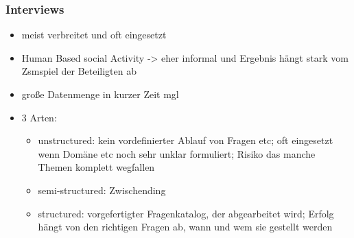\subsubsection{Interviews}
\begin{itemize}
	\item meist verbreitet und oft eingesetzt
	\item Human Based social Activity -> eher informal und Ergebnis hängt stark vom Zsmspiel der Beteiligten ab
	\item große Datenmenge in kurzer Zeit mgl
	\item 3 Arten:
	\begin{itemize}
		\item unstructured: kein vordefinierter Ablauf von Fragen etc; oft eingesetzt wenn Domäne etc noch sehr unklar formuliert; Risiko das manche Themen komplett wegfallen
		\item semi-structured: Zwischending
		\item structured: vorgefertigter Fragenkatalog, der abgearbeitet wird; Erfolg hängt von den richtigen Fragen ab, wann und wem sie gestellt werden
	\end{itemize}
\end{itemize}

